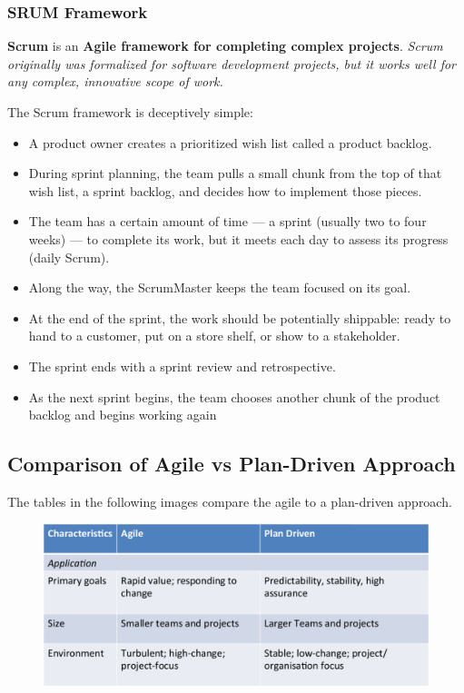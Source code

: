 \documentclass[a4paper]{article}
\begin{document}
\subsubsection{SRUM Framework}
\textbf{Scrum} is an \textbf{Agile framework for completing complex projects}. \textit{Scrum originally was formalized for software development projects, but it works well for any complex, innovative scope of work.} 

The Scrum framework is deceptively simple:

\begin{itemize}
\item A product owner creates a prioritized wish list called a product backlog.
\item During sprint planning, the team pulls a small chunk from the top of that wish list, a sprint backlog, and decides how to implement those pieces.
\item The team has a certain amount of time — a sprint (usually two to four weeks) — to complete its work, but it meets each day to assess its progress (daily Scrum).
\item Along the way, the ScrumMaster keeps the team focused on its goal.
\item At the end of the sprint, the work should be potentially shippable: ready to hand to a customer, put on a store shelf, or show to a stakeholder.
\item The sprint ends with a sprint review and retrospective.
\item As the next sprint begins, the team chooses another chunk of the product backlog and begins working again
\end{itemize}

\subsection{Comparison of Agile vs Plan-Driven Approach}
The tables in the following images compare the agile to a plan-driven approach.
\begin{figure}[H]
\begin{center} 
    \includegraphics[scale=0.3]{images/AgileTable1.pdf}
\end{center}
\end{figure}
\end{document}
